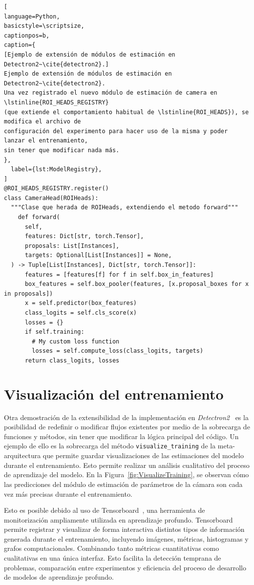\noindent\begin{minipage}{\textwidth}
\begin{lstlisting}[
language=Python,
basicstyle=\scriptsize,
captionpos=b,
caption={
[Ejemplo de extensión de módulos de estimación en Detectron2~\cite{detectron2}.]
Ejemplo de extensión de módulos de estimación en Detectron2~\cite{detectron2}.
Una vez registrado el nuevo módulo de estimación de camera en \lstinline{ROI_HEADS_REGISTRY}
(que extiende el comportamiento habitual de \lstinline{ROI_HEADS}), se modifica el archivo de
configuración del experimento para hacer uso de la misma y poder lanzar el entrenamiento,
sin tener que modificar nada más.
},
  label={lst:ModelRegistry},
]
@ROI_HEADS_REGISTRY.register()
class CameraHead(ROIHeads):
  """Clase que herada de ROIHeads, extendiendo el metodo forward"""
    def forward(
      self,
      features: Dict[str, torch.Tensor],
      proposals: List[Instances],
      targets: Optional[List[Instances]] = None,
  ) -> Tuple[List[Instances], Dict[str, torch.Tensor]]:
      features = [features[f] for f in self.box_in_features]
      box_features = self.box_pooler(features, [x.proposal_boxes for x in proposals])
      x = self.predictor(box_features)
      class_logits = self.cls_score(x)
      losses = {}
      if self.training:
        # My custom loss function
        losses = self.compute_loss(class_logits, targets)
      return class_logits, losses
\end{lstlisting}
\end{minipage}


\section{Visualización del entrenamiento}\label{app:VisualizeTraining}
Otra demostración de la extensibilidad de la implementación en \emph{Detectron2}~\cite{detectron2} es
la posibilidad de redefinir o modificar flujos existentes por medio de la sobrecarga de
funciones y métodos, sin tener que modificar la lógica principal del código. Un ejemplo de ello
es la sobrecarga del método \lstinline{visualize_training} de la meta-arquitectura que permite
guardar visualizaciones de las estimaciones del modelo durante el entrenamiento. Esto permite
realizar un análisis cualitativo del proceso de aprendizaje del modelo.
En la Figura~\ref{fig:VisualizeTraining},
se observan cómo las predicciones del módulo de estimación de parámetros de la cámara son cada vez más precisas durante el entrenamiento.
\par
Esto es posible debido al uso de Tensorboard~\cite{Tensorflow}, una herramienta de monitorización ampliamente
utilizada en aprendizaje profundo. Tensorboard permite registrar y visualizar de forma interactiva distintos
tipos de información generada durante el entrenamiento, incluyendo imágenes, métricas, histogramas y grafos
computacionales. Combinando tanto métricas cuantitativas como cualitativas en una única interfaz.
Esto facilita la detección temprana de problemas, comparación entre experimentos y eficiencia del proceso
de desarrollo de modelos de aprendizaje profundo.
